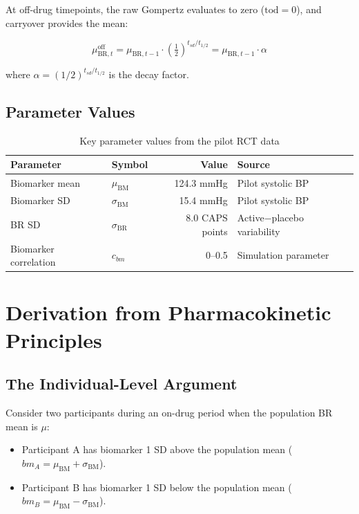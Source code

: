\documentclass[11pt]{article}
\begin{document}
At off-drug timepoints, the raw Gompertz evaluates to zero
($\text{tod} = 0$), and carryover provides the mean:

\[
\mu_{\text{BR},t}^{\text{off}} =
  \mu_{\text{BR},t-1} \cdot
  \left(\tfrac{1}{2}\right)^{t_{sd} / t_{1/2}}
= \mu_{\text{BR},t-1} \cdot \alpha
\]

where $\alpha = (1/2)^{t_{sd}/t_{1/2}}$ is the decay factor.

\subsection{Parameter Values}

\begin{table}[h]
\centering
\caption{Key parameter values from the pilot RCT data}
\begin{tabular}{llrl}
\toprule
Parameter & Symbol & Value & Source \\
\midrule
Biomarker mean & $\mu_{\text{BM}}$ & 124.3 mmHg &
  Pilot systolic BP \\
Biomarker SD & $\sigma_{\text{BM}}$ & 15.4 mmHg &
  Pilot systolic BP \\
BR SD & $\sigma_{\text{BR}}$ & 8.0 CAPS points &
  Active$-$placebo variability \\
Biomarker correlation & $c_{bm}$ & 0--0.5 &
  Simulation parameter \\
\bottomrule
\end{tabular}
\end{table}

\section{Derivation from Pharmacokinetic Principles}

\subsection{The Individual-Level Argument}

Consider two participants during an on-drug period when the
population BR mean is $\mu$:

\begin{itemize}
\item Participant A has biomarker 1 SD above the population
  mean ($bm_A = \mu_{\text{BM}} + \sigma_{\text{BM}}$).
\item Participant B has biomarker 1 SD below the population
  mean ($bm_B = \mu_{\text{BM}} - \sigma_{\text{BM}}$).
\end{itemize}
\end{document}
